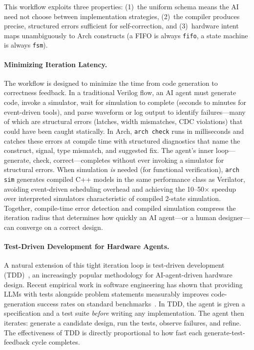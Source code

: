 \documentclass[manuscript]{acmart}
\begin{document}
This workflow exploits three properties: (1)~the uniform schema means the AI need not choose between implementation strategies, (2)~the compiler produces precise, structured errors sufficient for self-correction, and (3)~hardware intent maps unambiguously to Arch constructs (a FIFO is always \texttt{fifo}, a state machine is always \texttt{fsm}).

\paragraph{Minimizing Iteration Latency.}
The workflow is designed to minimize the time from code generation to correctness feedback. In a traditional Verilog flow, an AI agent must generate code, invoke a simulator, wait for simulation to complete (seconds to minutes for event-driven tools), and parse waveform or log output to identify failures---many of which are structural errors (latches, width mismatches, CDC violations) that could have been caught statically. In Arch, \texttt{arch check} runs in milliseconds and catches these errors at compile time with structured diagnostics that name the construct, signal, type mismatch, and suggested fix. The agent's inner loop---generate, check, correct---completes without ever invoking a simulator for structural errors. When simulation \emph{is} needed (for functional verification), \texttt{arch sim} generates compiled C++ models in the same performance class as Verilator, avoiding event-driven scheduling overhead and achieving the 10--50$\times$ speedup over interpreted simulators characteristic of compiled 2-state simulation. Together, compile-time error detection and compiled simulation compress the iteration radius that determines how quickly an AI agent---or a human designer---can converge on a correct design.

\paragraph{Test-Driven Development for Hardware Agents.}
A natural extension of this tight iteration loop is test-driven development (TDD)~\cite{beck2003tdd}, an increasingly popular methodology for AI-agent-driven hardware design. Recent empirical work in software engineering has shown that providing LLMs with tests alongside problem statements measurably improves code-generation success rates on standard benchmarks~\cite{mathews2024tdd}. In TDD, the agent is given a specification and a test suite \emph{before} writing any implementation. The agent then iterates: generate a candidate design, run the tests, observe failures, and refine. The effectiveness of TDD is directly proportional to how fast each generate-test-feedback cycle completes.
\end{document}
